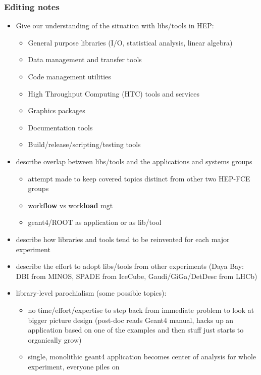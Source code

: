 
\subsubsection{Editing notes}


\begin{itemize}
\item Give our understanding of the situation with libs/tools in HEP:
  \begin{itemize}
  \item General purpose libraries (I/O, statistical analysis, linear algebra)
  \item Data management and transfer tools
  \item Code management utilities
  \item High Throughput Computing (HTC) tools and services
  \item Graphics packages
  \item Documentation tools
  \item Build/release/scripting/testing tools
  \end{itemize}
\item describe overlap between libs/tools and the applications and systems groups
  \begin{itemize}
  \item attempt made to keep covered topics distinct from other two HEP-FCE groups
  \item work\textbf{flow} vs work\textbf{load} mgt
  \item geant4/ROOT as application or as lib/tool
  \end{itemize}
\item describe how libraries and tools tend to be reinvented for each major experiment 
\item describe the effort to adopt libs/tools from other experiments (Daya Bay: DBI from MINOS, SPADE from IceCube, Gaudi/GiGa/DetDesc from LHCb)
\item library-level parochialism (some possible topics):
  \begin{itemize}
  \item no time/effort/expertise to step back from immediate problem to look at bigger picture design (post-doc reads Geant4 manual, hacks up an application based on one of the examples and then stuff just starts to organically grow)
  \item single, monolithic geant4 application becomes center of analysis for whole experiment, everyone piles on

\end{itemize}
\end{itemize}
